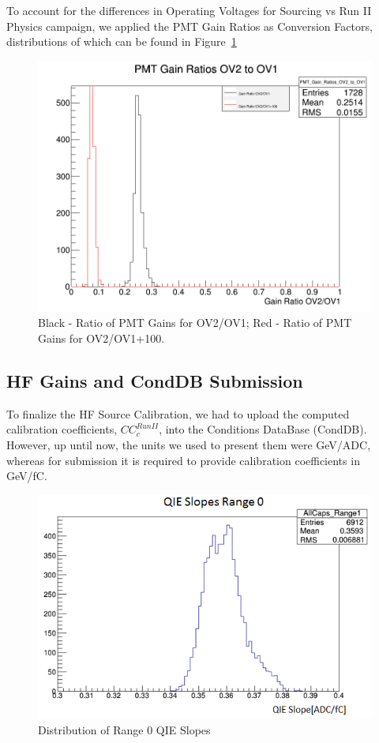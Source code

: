 To account for the differences in Operating Voltages for Sourcing vs Run II Physics campaign, we applied the PMT Gain Ratios as Conversion Factors, distributions of which can be found in Figure~\ref{fig:PMT_Gains}
\begin{figure}[!h]
	\begin{center}
		\includegraphics[width=.5\textwidth]{figures/ch_hfcalibration/GainRatios.png}
		\caption
		{Black - Ratio of PMT Gains for OV2/OV1; Red - Ratio of PMT Gains for OV2/OV1+100.
		}
		\label{fig:PMT_Gains}
	\end{center}
\end{figure}

\subsection{HF Gains and CondDB Submission}
To finalize the HF Source Calibration, we had to upload the computed calibration
coefficients, ${CC}^{Run II}_{c}$, into the Conditions DataBase (CondDB).
However, up until now, the units we used to present them were GeV/ADC, whereas
for submission it is required to provide calibration coefficients in GeV/fC.

\begin{figure}[htb]
	\begin{center}
		\includegraphics[width=.5\textwidth]{figures/ch_hfcalibration/QIE_Slopes_Range0.png}
		\caption{Distribution of Range 0 QIE Slopes}
		\label{fig:QIESlopes}
	\end{center}
\end{figure}

